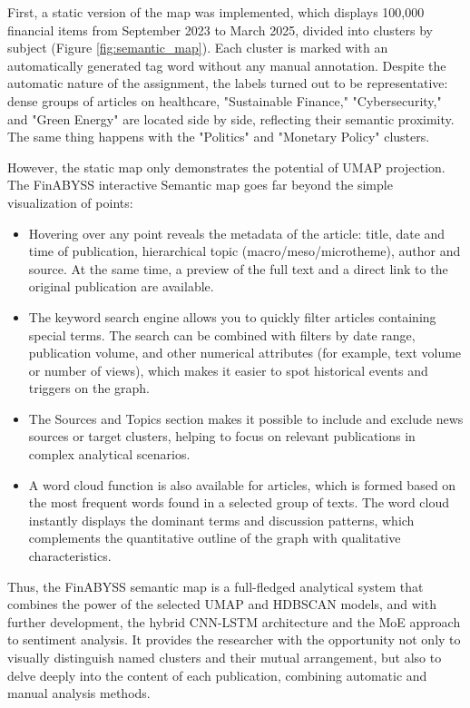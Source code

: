 First, a static version of the map was implemented, which displays 100,000 financial items from September 2023
to March 2025, divided into clusters by subject (Figure \ref{fig:semantic_map}). Each cluster is marked
with an automatically generated tag word without any manual annotation. Despite the automatic nature
of the assignment, the labels turned out to be representative: dense groups of articles on healthcare,
"Sustainable Finance," "Cybersecurity," and "Green Energy" are located side by side, reflecting their semantic
proximity. The same thing happens with the "Politics" and "Monetary Policy" clusters.

However, the static map only demonstrates the potential of UMAP projection. The FinABYSS interactive Semantic
map goes far beyond the simple visualization of points:

\begin{itemize}
    \item Hovering over any point reveals the metadata of the article: title, date and time of publication,
    hierarchical topic (macro/meso/microtheme), author and source. At the same time, a preview of the full
    text and a direct link to the original publication are available.
    \item The keyword search engine allows you to quickly filter articles containing special terms. The search
    can be combined with filters by date range, publication volume, and other numerical attributes (for example,
    text volume or number of views), which makes it easier to spot historical events and triggers on the graph.
    \item The Sources and Topics section makes it possible to include and exclude news sources or target clusters,
    helping to focus on relevant publications in complex analytical scenarios.
    \item A word cloud function is also available for articles, which is formed based on the most frequent words
    found in a selected group of texts. The word cloud instantly displays the dominant terms and discussion patterns,
    which complements the quantitative outline of the graph with qualitative characteristics.
\end{itemize}

Thus, the FinABYSS semantic map is a full-fledged analytical system that combines the power of the selected UMAP
and HDBSCAN models, and with further development, the hybrid CNN-LSTM architecture and the MoE approach to sentiment
analysis. It provides the researcher with the opportunity not only to visually distinguish named clusters and
their mutual arrangement, but also to delve deeply into the content of each publication, combining automatic and
manual analysis methods.

